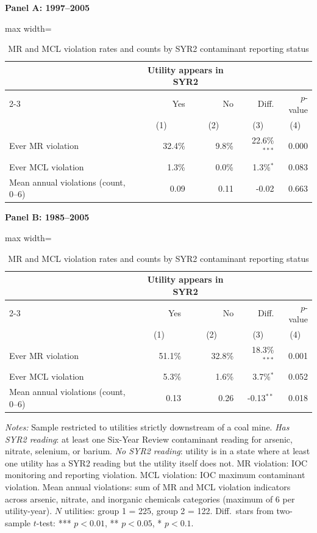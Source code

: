\begin{table}[htbp]
\centering
\caption{MR and MCL violation rates and counts by SYR2 contaminant reporting status}
\label{tab:syr2_mr_comparison}
\textbf{Panel A: 1997--2005}\\[2pt]
\begin{adjustbox}{max width=\textwidth}
\begin{tabular}{lrrrr}
\toprule
 & \multicolumn{2}{c}{Utility appears in SYR2} & & \\
\cmidrule(lr){2-3}
 & Yes & No & Diff. & $p$-value \\
 & \multicolumn{1}{c}{(1)} & \multicolumn{1}{c}{(2)} & \multicolumn{1}{c}{(3)} & \multicolumn{1}{c}{(4)} \\
\hline
Ever MR violation & 32.4\% & 9.8\% & 22.6\%$^{***}$ & 0.000 \\
Ever MCL violation & 1.3\% & 0.0\% & 1.3\%$^{*}$ & 0.083 \\
\hline
Mean annual violations (count, 0--6) & 0.09 & 0.11 & -0.02 & 0.663 \\
\bottomrule
\end{tabular}
\end{adjustbox}
\vspace{8pt}
\textbf{Panel B: 1985--2005}\\[2pt]
\begin{adjustbox}{max width=\textwidth}
\begin{tabular}{lrrrr}
\toprule
 & \multicolumn{2}{c}{Utility appears in SYR2} & & \\
\cmidrule(lr){2-3}
 & Yes & No & Diff. & $p$-value \\
 & \multicolumn{1}{c}{(1)} & \multicolumn{1}{c}{(2)} & \multicolumn{1}{c}{(3)} & \multicolumn{1}{c}{(4)} \\
\hline
Ever MR violation & 51.1\% & 32.8\% & 18.3\%$^{***}$ & 0.001 \\
Ever MCL violation & 5.3\% & 1.6\% & 3.7\%$^{*}$ & 0.052 \\
\hline
Mean annual violations (count, 0--6) & 0.13 & 0.26 & -0.13$^{**}$ & 0.018 \\
\bottomrule
\end{tabular}
\end{adjustbox}
\begin{minipage}{\linewidth}
\vspace{4pt}
\footnotesize
\raggedright
\textit{Notes:} Sample restricted to utilities strictly downstream of a coal mine. \textit{Has SYR2 reading}: at least one Six-Year Review contaminant reading for arsenic, nitrate, selenium, or barium. \textit{No SYR2 reading}: utility is in a state where at least one utility has a SYR2 reading but the utility itself does not. MR violation: IOC monitoring and reporting violation. MCL violation: IOC maximum contaminant violation. Mean annual violations: sum of MR and MCL violation indicators across arsenic, nitrate, and inorganic chemicals categories (maximum of 6 per utility-year). $N$ utilities: group 1 = 225, group 2 = 122. Diff.~stars from two-sample $t$-test: *** $p<0.01$, ** $p<0.05$, * $p<0.1$.
\end{minipage}
\end{table}

